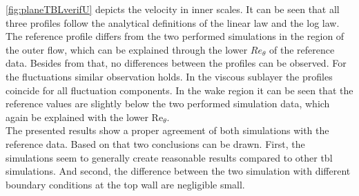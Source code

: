 \autoref{fig:planeTBLverifU} depicts the velocity in inner scales.
It can be seen that all three profiles follow the analytical definitions of the linear law and the log law.
The reference profile differs from the two performed simulations in the region of the outer flow, which can be explained through the lower $Re_{\theta}$ of the reference data.
Besides from that, no differences between the profiles can be observed.
For the fluctuations similar observation holds.
In the viscous sublayer the profiles coincide for all fluctuation components.
In the wake region it can be seen that the reference values are slightly below the two performed simulation data, which again be explained with the lower $\mathrm{Re}_{\theta}$. \\
The presented results show a proper agreement of both simulations with the reference data.
Based on that two conclusions can be drawn.
First, the simulations seem to generally create reasonable results compared to other \acrshort{tbl} simulations.
And second, the difference between the two simulation with different boundary conditions at the top wall are negligible small.


